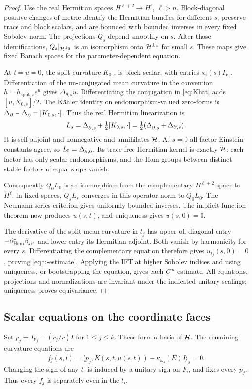\begin{proof}
Use the real Hermitian spaces $H^{\ell+2}\to H^\ell$, $\ell>n$.
Block-diagonal positive changes of metric identify the Hermitian bundles
for different $s$, preserve trace and block scalars, and are bounded
with bounded inverses in every fixed Sobolev norm. The projections
$Q_s$ depend smoothly on $s$. After those identifications,
$Q_s|_{\mathcal H^{\perp_0}}$ is an isomorphism onto
$\mathcal H^{\perp_s}$ for small $s$. These maps give fixed Banach spaces
for the parameter-dependent equation.

At $t=u=0$, the split curvature $K_{0,s}$ is block scalar, with
entries $\kappa_i(s)I_{F_i}$. Differentiation of the un-conjugated
mean curvature in the convention $h=h_{\mathrm{split},s}e^u$ gives
$\Delta_{\partial,s}u$. Differentiating the conjugation in
\eqref{eq:Khat} adds $[u,K_{0,s}]/2$. The K\"ahler identity on
endomorphism-valued zero-forms is
$\Delta_{\partial}-\Delta_{\bar\partial}=[K_{0,s},\cdot]$. Thus the real
Hermitian linearization is
\begin{equation}\label{eq:real-linearization}
 L_s=\Delta_{\bar\partial,s}+\tfrac12[K_{0,s},\cdot]
    =\tfrac12(\Delta_{\bar\partial,s}+\Delta_{\partial,s}).
\end{equation}
It is self-adjoint and nonnegative and annihilates $\mathcal H$.
At $s=0$ all factor Einstein constants agree, so
$L_0=\Delta_{\bar\partial,0}$. Its trace-free Hermitian kernel is exactly
$\mathcal H$: each factor has only scalar endomorphisms, and the Hom groups
between distinct stable factors of equal slope vanish.

Consequently $Q_0L_0$ is an isomorphism from the complementary
$H^{\ell+2}$ space to $H^\ell$. In fixed spaces, $Q_sL_s$ converges
in this operator norm to $Q_0L_0$. The Neumann-series criterion gives
uniformly bounded inverses. The implicit-function theorem now produces
$u(s,t)$, and uniqueness gives $u(s,0)=0$.

The derivative of the split mean curvature in $t_j$ has upper
off-diagonal entry $-\bar\partial_{\operatorname{Hom}}^*\beta_{j,s}$ and lower entry
its Hermitian adjoint. Both vanish by harmonicity for every $s$.
Differentiating the complementary equation therefore
gives $u_{t_j}(s,0)=0$, proving \eqref{eq:u-estimate}. Applying the
IFT at higher Sobolev indices and using uniqueness, or bootstrapping
the equation, gives each $C^m$ estimate. All equations, projections
and normalizations are invariant under the indicated unitary scalings;
uniqueness proves equivariance.
\end{proof}

\subsection{Scalar equations on the coordinate faces}
Set $p_j=I_{F_j}-(r_j/r)I$ for $1\le j\le k$. These form a basis
of $\mathcal H$. The remaining curvature equations are
\[
 f_j(s,t)=\bigl\langle p_j,
 \widehat K(s,t,u(s,t))-\kappa_{\omega_s}(E)I\bigr\rangle_s=0.
\]
Changing the sign of any $t_i$ is induced by a unitary sign on $F_i$,
and fixes every $p_j$. Thus every $f_j$ is separately even in the
$t_i$.

